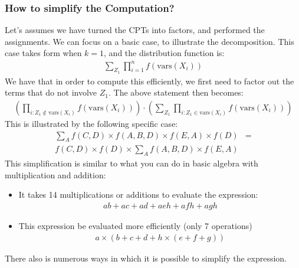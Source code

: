 \documentclass{article}
\begin{document}
\subsubsection*{How to simplify the Computation?}
Let's assumes we have turned the CPTs into factors, and performed the assignments. We can focus on a basic case, to illustrate the decomposition. This case takes form when $ k =1$, and the distribution function is:
\begin{align*}
\sum_{Z_1} \prod_{i=1}^{n} f(\text{vars}(X_i))
\end{align*}
We have that in order to compute this efficiently, we first need to factor out the terms that do not involve $ Z_1 $. The above statement then becomes:
\begin{align*}
\left(  \prod_{i: Z_1 \notin \text{vars}(X_i)} f(\text{vars}(X_i))   \right) \cdot \left( \sum_{Z_1} \prod_{i: Z_1 \in \text{vars}(X_i)} f(\text{vars}(X_i)) \right)
\end{align*}
This is illustrated by the following specific case:
\begin{align*}
\sum_A f(C,D) \times f(A,B,D) \times f(E,A) \times f(D) &= \\
  f(C,D) \times f(D) \times \sum_A f(A,B,D) \times f(E,A) 
\end{align*}
This simplification is similar to what you can do in basic algebra with multiplication and addition:
\begin{itemize}
	\item It takes 14 multiplications or additions to evaluate the expression:
	\begin{align*}
	a b + a c + a d + a e h + a f h + ag h
	\end{align*}
	\item This expression be evaluated more efficiently (only 7 operations)
	\begin{align*}
	a \times (b + c + d + h \times (e + f + g))
	\end{align*}
\end{itemize}
There also is numerous ways in which it is possible to simplify the expression. 
\end{document}
